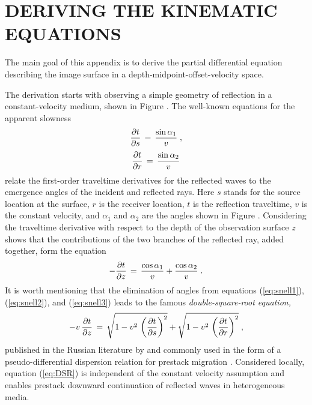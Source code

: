 \newpage


\newpage

\section{DERIVING THE KINEMATIC EQUATIONS}
The main goal of this appendix is to derive the partial differential
equation describing the image surface in a
depth-midpoint-offset-velocity space.


The derivation starts with observing a simple geometry of reflection
in a constant-velocity medium, shown in Figure . The
well-known equations for the apparent slowness
\begin{equation}
{{\partial t} \over {\partial s}} \,=\,
{ {\sin{\alpha_1}} \over {v}}\;,
\label{eq:snell1}
\end{equation}
\begin{equation}
{{\partial t} \over {\partial r}} \,=\, 
{{\sin{\alpha_2}} \over {v}}  
\label{eq:snell2}
\end{equation} 
relate the first-order traveltime derivatives for the reflected waves
to the emergence angles of the incident and reflected rays. Here $s$
stands for the source location at the surface, $r$ is the receiver
location, $t$ is the reflection traveltime, $v$ is the constant
velocity, and $\alpha_1$ and $\alpha_2$ are the angles shown in Figure
. Considering the traveltime derivative with respect to
the depth of the observation surface $z$ shows that the
contributions of the two branches of the reflected ray, added
together, form the equation
\begin{equation}
- {{\partial t} \over {\partial z}} \,=\,
{{\cos{\alpha_1}} \over {v}} +
{{\cos{\alpha_2}} \over {v}}\;.
\label{eq:snell3}
\end{equation}
It is worth mentioning that the elimination of angles from equations
(\ref{eq:snell1}), (\ref{eq:snell2}), and (\ref{eq:snell3}) leads to
the famous {\em double-square-root equation,}
\begin{equation}
- v\,{{\partial t} \over {\partial z}} \,=\,
\sqrt{1 -  v^2\,\left({{\partial t} \over {\partial s}}\right)^2} +
\sqrt{1 -  v^2\,\left({{\partial t} \over {\partial r}}\right)^2}\;,
\label{eq:DSR}
\end{equation}
published in the Russian literature by \cite{alekseev} and commonly
used in the form of a pseudo-differential dispersion relation
\cite[]{Clayton.sep.14.21,Claerbout.blackwell.85} for prestack
migration \cite[]{Yilmaz.sepphd.18,Popovici.sep.84.53}. Considered
locally, equation (\ref{eq:DSR}) is independent of the constant velocity
assumption and enables  prestack downward
continuation of reflected waves in heterogeneous 
media.

